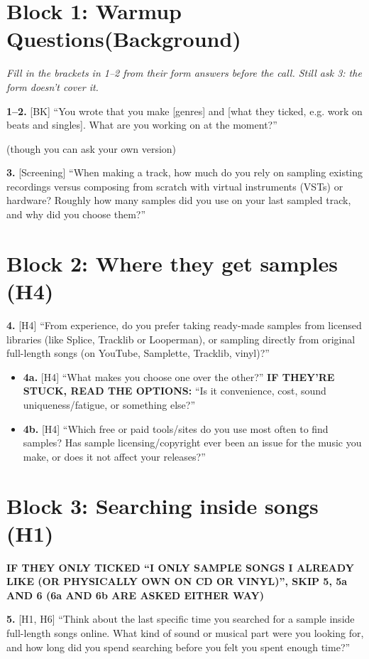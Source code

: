 \documentclass[12pt,a4paper]{report}
\newcommand{\cond}[1]{\textcolor{condition}{\textbf{#1}}}
\begin{document}
\section{Block 1: Warmup Questions(Background)}

\textit{Fill in the brackets in 1–2 from their form answers before the call. Still ask 3: the form doesn’t cover it.}

\textbf{1–2.} [BK] “You wrote that you make [genres] and [what they ticked, e.g. work on beats and singles]. What are you working on at the moment?”

(though you can ask your own version)

\textbf{3.} [Screening] “When making a track, how much do you rely on sampling existing recordings versus composing from scratch with virtual instruments (VSTs) or hardware? Roughly how many samples did you use on your last sampled track, and why did you choose them?”

\section{Block 2: Where they get samples (H4)}

\textbf{4.} [H4] “From experience, do you prefer taking ready-made samples from licensed libraries (like Splice, Tracklib or Looperman), or sampling directly from original full-length songs (on YouTube, Samplette, Tracklib, vinyl)?”

\begin{itemize}
  \item \textbf{4a.} [H4] “What makes you choose one over the other?” \cond{IF THEY’RE STUCK, READ THE OPTIONS:} “Is it convenience, cost, sound uniqueness/fatigue, or something else?”
  \item \textbf{4b.} [H4] “Which free or paid tools/sites do you use most often to find samples? Has sample licensing/copyright ever been an issue for the music you make, or does it not affect your releases?”
\end{itemize}

\section{Block 3: Searching inside songs (H1)}

\cond{IF THEY ONLY TICKED “I ONLY SAMPLE SONGS I ALREADY LIKE (OR PHYSICALLY OWN ON CD OR VINYL)”, SKIP 5, 5a AND 6 (6a AND 6b ARE ASKED EITHER WAY)}

\textbf{5.} [H1, H6] “Think about the last specific time you searched for a sample inside full-length songs online. What kind of sound or musical part were you looking for, and how long did you spend searching before you felt you spent enough time?”
\end{document}
